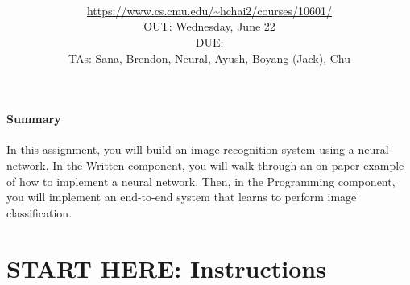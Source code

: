 \documentclass[11pt,addpoints,answers]{exam}
\title{\textsc{\hwName}
} %
\author{\courseName\\
\url{https://www.cs.cmu.edu/~hchai2/courses/10601/} \\
OUT: Wednesday, June 22 \\
DUE: \dueDate{} \\ 
TAs: Sana, Brendon, Neural, Ayush, Boyang (Jack), Chu
}
\date{}
\date{}
\begin{document}
\maketitle

\begin{notebox}
\paragraph{Summary} In this assignment, you will build an image recognition system using a neural network. In the Written component, you will walk through an on-paper example of how to implement a neural network. Then, in the Programming component, you will implement an end-to-end system that learns to perform image classification.
\end{notebox}
\newcommand \maxsubs {10 }
\section*{START HERE: Instructions}
\end{document}
